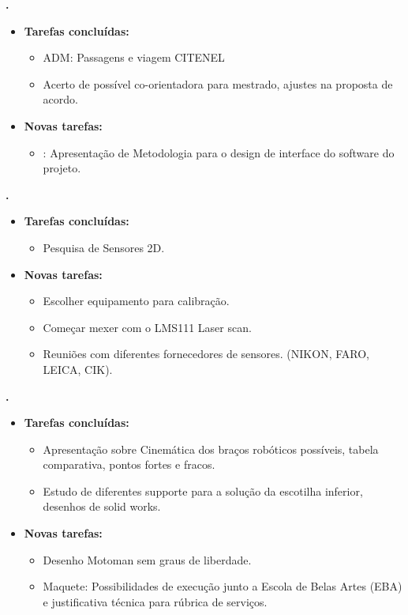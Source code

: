 	\textbf{\julia.} 
	\begin{itemize}
		\item \textbf{Tarefas concluídas:}
			\begin{itemize}    
				\item ADM: Passagens e viagem CITENEL
				\item Acerto de possível co-orientadora para mestrado, ajustes na proposta
				de acordo.
			\end{itemize}
		
		\item \textbf{Novas tarefas:}
			\begin{itemize} 
				\item: Apresentação de Metodologia para o design de interface do software do
				projeto.
			\end{itemize}
	\end{itemize}
					
\textbf{\gabriel.} 
	\begin{itemize}
		\item \textbf{Tarefas concluídas:}
			\begin{itemize}    
				\item Pesquisa de Sensores 2D.
			\end{itemize}
		
		\item \textbf{Novas tarefas:}
			\begin{itemize} 
				\item Escolher equipamento para calibração.
				\item Começar mexer com o LMS111 Laser scan. 
				\item Reuniões com diferentes fornecedores de sensores. (NIKON, FARO,
				LEICA, CIK).
			\end{itemize}
	\end{itemize}
					
			
   \textbf{.} 
	\begin{itemize}
		\item \textbf{Tarefas concluídas:}
			\begin{itemize}    
				\item Apresentação sobre Cinemática dos braços robóticos possíveis, 
				tabela comparativa, pontos fortes e fracos.
				\item Estudo de diferentes supporte para a solução da escotilha inferior,
				desenhos de solid works.
			\end{itemize}
		
		\item \textbf{Novas tarefas:}
			\begin{itemize} 
			    \item Desenho Motoman sem graus de liberdade.
			    \item Maquete: Possibilidades de execução junto a Escola de Belas Artes
			    (EBA) e justificativa técnica para rúbrica de serviços.
			\end{itemize}
	\end{itemize}

